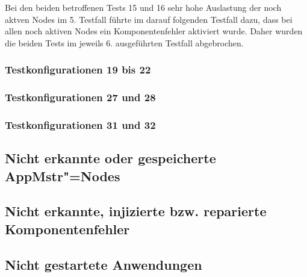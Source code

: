 Bei den beiden betroffenen Tests 15 und 16 sehr hohe Auslastung der noch aktven Nodes im 5. Testfall führte im darauf folgenden Testfall dazu, dass bei allen noch aktiven Nodes ein Komponentenfehler aktiviert wurde.
Daher wurden die beiden Tests im jeweils 6. ausgeführten Testfall abgebrochen.

\subsubsection{Testkonfigurationen 19 bis 22}
\label{sec:noReconf1922}

\subsubsection{Testkonfigurationen 27 und 28}
\label{sec:noReconf2728}

\subsubsection{Testkonfigurationen 31 und 32}
\label{sec:noReconf3132}

\subsection{Nicht erkannte oder gespeicherte \ac{AppMstr}"=Nodes}
\label{sec:noDetectedHost2}




\subsection{Nicht erkannte, injizierte bzw. reparierte Komponentenfehler}
\label{sec:noDetectedFault}


\subsection{Nicht gestartete Anwendungen}
\label{sec:notStartedApps}


